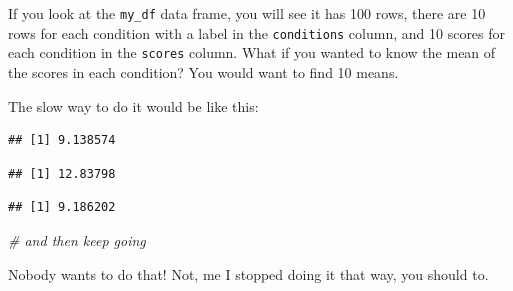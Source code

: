 \documentclass[]{book}
\newenvironment{Shaded}{\begin{snugshade}}{\end{snugshade}}
\newcommand{\KeywordTok}[1]{\textcolor[rgb]{0.13,0.29,0.53}{\textbf{#1}}}
\newcommand{\StringTok}[1]{\textcolor[rgb]{0.31,0.60,0.02}{#1}}
\newcommand{\CommentTok}[1]{\textcolor[rgb]{0.56,0.35,0.01}{\textit{#1}}}
\newcommand{\OperatorTok}[1]{\textcolor[rgb]{0.81,0.36,0.00}{\textbf{#1}}}
\newcommand{\NormalTok}[1]{#1}
\begin{document}
If you look at the \texttt{my\_df} data frame, you will see it has 100
rows, there are 10 rows for each condition with a label in the
\texttt{conditions} column, and 10 scores for each condition in the
\texttt{scores} column. What if you wanted to know the mean of the
scores in each condition? You would want to find 10 means.

The slow way to do it would be like this:

\begin{Shaded}
\end{Shaded}

\begin{verbatim}
## [1] 9.138574
\end{verbatim}

\begin{Shaded}
\end{Shaded}

\begin{verbatim}
## [1] 12.83798
\end{verbatim}

\begin{Shaded}
\end{Shaded}

\begin{verbatim}
## [1] 9.186202
\end{verbatim}

\begin{Shaded}
\begin{Highlighting}[]
\CommentTok{# and then keep going}
\end{Highlighting}
\end{Shaded}

Nobody wants to do that! Not, me I stopped doing it that way, you should
to.
\end{document}
